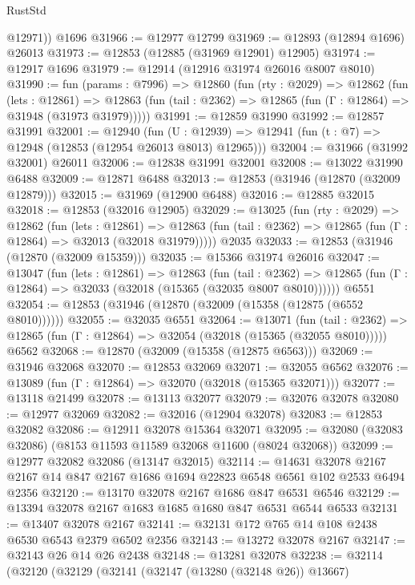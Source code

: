 \begin{lexlean}{RustStd}
\begin{coremodule}
        @12971))
    @1696
@31966 := @12977 @12799
@31969 := @12893 (@12894 @1696) @26013
@31973 := @12853 (@12885 (@31969 @12901) @12905)
@31974 := @12917 @1696
@31979 := @12914 (@12916 @31974 @26016 @8007 @8010)
@31990 := fun (params : @7996) =>
  @12860
    (fun (rty : @2029) =>
    @12862
      (fun (lets : @12861) =>
      @12863 (fun (tail : @2362) => @12865 (fun (Γ : @12864) => @31948 (@31973 @31979)))))
@31991 := @12859 @31990
@31992 := @12857 @31991
@32001 := @12940
    (fun (U : @12939) => @12941 (fun (t : @7) => @12948 (@12853 (@12954 @26013 @8013) @12965)))
@32004 := @31966 (@31992 @32001) @26011
@32006 := @12838 @31991 @32001
@32008 := @13022 @31990 @6488
@32009 := @12871 @6488
@32013 := @12853 (@31946 (@12870 (@32009 @12879)))
@32015 := @31969 (@12900 @6488)
@32016 := @12885 @32015
@32018 := @12853 (@32016 @12905)
@32029 := @13025
    (fun (rty : @2029) =>
    @12862
      (fun (lets : @12861) =>
      @12863 (fun (tail : @2362) => @12865 (fun (Γ : @12864) => @32013 (@32018 @31979)))))
    @2035
@32033 := @12853 (@31946 (@12870 (@32009 @15359)))
@32035 := @15366 @31974 @26016
@32047 := @13047
    (fun (lets : @12861) =>
    @12863
      (fun (tail : @2362) =>
      @12865 (fun (Γ : @12864) => @32033 (@32018 (@15365 (@32035 @8007 @8010))))))
    @6551
@32054 := @12853 (@31946 (@12870 (@32009 (@15358 (@12875 (@6552 @8010))))))
@32055 := @32035 @6551
@32064 := @13071
    (fun (tail : @2362) => @12865 (fun (Γ : @12864) => @32054 (@32018 (@15365 (@32055 @8010)))))
    @6562
@32068 := @12870 (@32009 (@15358 (@12875 @6563)))
@32069 := @31946 @32068
@32070 := @12853 @32069
@32071 := @32055 @6562
@32076 := @13089 (fun (Γ : @12864) => @32070 (@32018 (@15365 @32071)))
@32077 := @13118 @21499
@32078 := @13113 @32077
@32079 := @32076 @32078
@32080 := @12977 @32069
@32082 := @32016 (@12904 @32078)
@32083 := @12853 @32082
@32086 := @12911 @32078 @15364 @32071
@32095 := @32080 (@32083 @32086) (@8153 @11593 @11589 @32068 @11600 (@8024 @32068))
@32099 := @12977 @32082 @32086 (@13147 @32015)
@32114 := @14631
    @32078
    @2167
    @2167
    @14
    @847
    @2167
    @1686
    @1694
    @22823
    @6548
    @6561
    @102
    @2533
    @6494
    @2356
@32120 := @13170 @32078 @2167 @1686 @847 @6531 @6546
@32129 := @13394 @32078 @2167 @1683 @1685 @1680 @847 @6531 @6544 @6533
@32131 := @13407 @32078 @2167
@32141 := @32131 @172 @765 @14 @108 @2438 @6530 @6543 @2379 @6502 @2356
@32143 := @13272 @32078 @2167
@32147 := @32143 @26 @14 @26 @2438
@32148 := @13281 @32078
@32238 := @32114
    (@32120
      (@32129
        (@32141
          (@32147 (@13280 (@32148 @26)) @13667)

\end{coremodule}
\end{lexlean}

